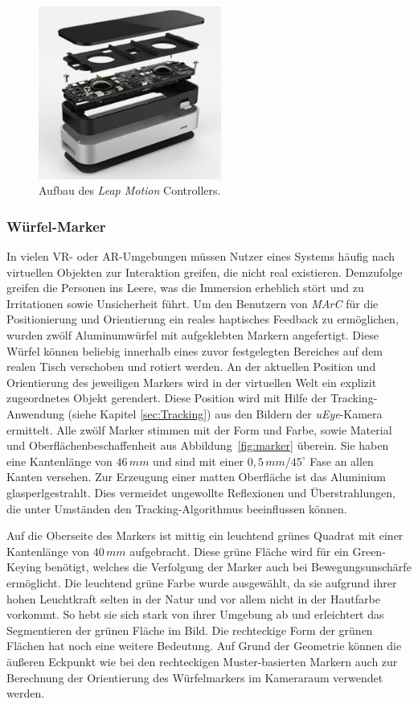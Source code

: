 \begin{figure}[H]
	\centering
	\includegraphics[width=6cm]{Bilder/leap-motion.png}			
		\caption{Aufbau des \emph{Leap Motion} Controllers.~\cite{website:LeapMotionBlog}}
		\label{fig:leapMotion}
\end{figure}


\subsubsection{Würfel-Marker}\label{sec:WürfelMarker} 
In vielen VR- oder AR-Umgebungen müssen Nutzer eines Systems häufig nach virtuellen Objekten zur Interaktion greifen, die nicht real existieren. Demzufolge greifen die Personen ins Leere, was die Immersion erheblich stört und zu Irritationen sowie Unsicherheit führt.
Um den Benutzern von \textit{MArC} für die Positionierung und Orientierung ein reales haptisches Feedback zu ermöglichen, wurden zwölf Aluminumwürfel mit aufgeklebten Markern angefertigt. Diese Würfel können beliebig innerhalb eines zuvor festgelegten Bereiches auf dem realen Tisch verschoben und rotiert werden. An der aktuellen Position und Orientierung des jeweiligen Markers wird in der virtuellen Welt ein explizit zugeordnetes Objekt gerendert. Diese Position wird mit Hilfe der Tracking-Anwendung (siehe Kapitel \ref{sec:Tracking}) aus den Bildern der \emph{uEye}-Kamera ermittelt.
Alle zwölf Marker stimmen mit der Form und Farbe, sowie Material und Oberflächenbeschaffenheit aus Abbildung~\ref{fig:marker} überein. Sie haben eine Kantenlänge von $46\,mm$ und sind mit einer $0,5\,mm$/$45^\circ$ Fase an allen Kanten versehen. Zur Erzeugung einer matten Oberfläche ist das Aluminium glasperlgestrahlt. Dies vermeidet ungewollte Reflexionen und Überstrahlungen, die unter Umständen den Tracking-Algorithmus beeinflussen können.

Auf die Oberseite des Markers ist mittig ein leuchtend grünes Quadrat mit einer Kantenlänge von $40\,mm$ aufgebracht. Diese grüne Fläche wird für ein Green-Keying benötigt, welches die Verfolgung der Marker auch bei Bewegungsunschärfe ermöglicht. Die leuchtend grüne Farbe wurde ausgewählt, da sie aufgrund ihrer hohen Leuchtkraft selten in der Natur und vor allem nicht in der Hautfarbe vorkommt. So hebt sie sich stark von ihrer Umgebung ab und erleichtert das Segmentieren der grünen Fläche im Bild. Die rechteckige Form der grünen Flächen hat noch eine weitere Bedeutung. Auf Grund der Geometrie können die äußeren Eckpunkt wie bei den rechteckigen Muster-basierten Markern auch zur Berechnung der Orientierung des Würfelmarkers im Kameraraum verwendet werden.

